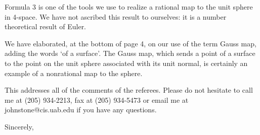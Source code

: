 \begin{letter}
\begin{itemize}
	Formula 3 is one of the tools we use to realize a rational
	map to the unit sphere in 4-space.  We have not ascribed
	this result to ourselves: it is a number theoretical result
	of Euler.

	We have elaborated, at the bottom of page 4, on our use
	of the term Gauss map, adding the words `of a surface'.
	The Gauss map, which sends a point of a surface to the point
	on the unit sphere associated with its unit normal,
	is certainly an example of a nonrational map to the sphere.
\end{itemize}

This addresses all of the comments of the referees.
Please do not hesitate to call me at (205) 934-2213,
fax at (205) 934-5473 or
email me at \\
johnstone@cis.uab.edu if you have any questions.
	
\closing{Sincerely,}
\end{letter}

